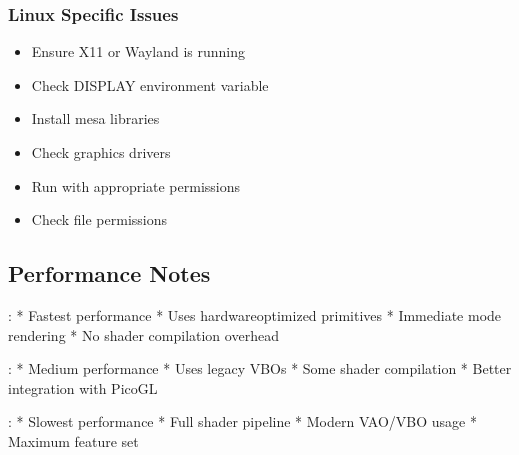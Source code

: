 \documentclass[a4paper,10pt,english,openany,oneside]{sphinxmanual}
\begin{document}
\subsubsection{Linux Specific Issues}
\label{\detokenize{legacy_examples:linux-specific-issues}}\begin{description}
\begin{itemize}
\item {} 
\sphinxAtStartPar
Ensure X11 or Wayland is running

\item {} 
\sphinxAtStartPar
Check DISPLAY environment variable

\end{itemize}

\begin{itemize}
\item {} 
\sphinxAtStartPar
Install mesa libraries

\item {} 
\sphinxAtStartPar
Check graphics drivers

\end{itemize}

\begin{itemize}
\item {} 
\sphinxAtStartPar
Run with appropriate permissions

\item {} 
\sphinxAtStartPar
Check file permissions

\end{itemize}

\end{description}


\subsection{Performance Notes}
\label{\detokenize{legacy_examples:performance-notes}}
\sphinxAtStartPar
{}:
* Fastest performance
* Uses hardware\sphinxhyphen{}optimized primitives
* Immediate mode rendering
* No shader compilation overhead

\sphinxAtStartPar
{}:
* Medium performance
* Uses legacy VBOs
* Some shader compilation
* Better integration with PicoGL

\sphinxAtStartPar
{}:
* Slowest performance
* Full shader pipeline
* Modern VAO/VBO usage
* Maximum feature set
\end{document}
